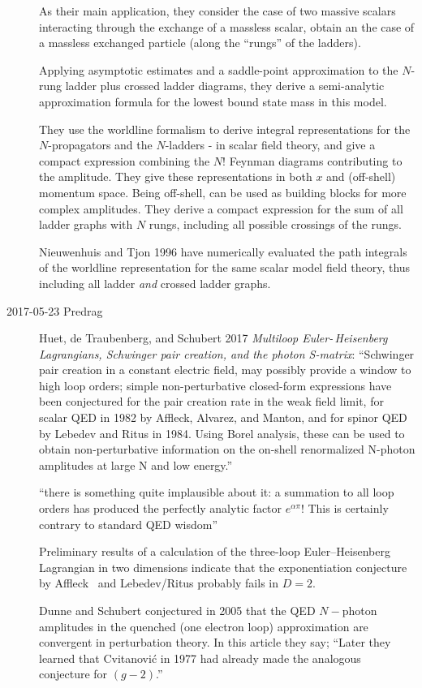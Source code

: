 \begin{description}
As their main application, they consider the case of two massive scalars
interacting through the exchange of a massless scalar, obtain an the case
of a massless exchanged particle (along the ``rungs'' of the ladders).

Applying
asymptotic estimates and a saddle-point approximation to the $N$-rung
ladder plus crossed ladder diagrams, they derive a semi-analytic
approximation formula for the lowest bound state mass in this model.

They use the worldline formalism to derive integral representations for
the $N$-propagators and the $N$-ladders - in scalar field theory,
and give a compact expression combining the $N!$ Feynman diagrams
contributing to the amplitude. They give these representations in both
$x$ and (off-shell) momentum space. Being off-shell, can be used
as building blocks for more complex amplitudes. They derive a
compact expression for the sum of all ladder graphs with $N$ rungs,
including all possible crossings of the rungs.

Nieuwenhuis and Tjon 1996 have numerically evaluated the path
integrals of the worldline representation for the same scalar model field
theory, thus including all ladder {\it and}
crossed ladder graphs.

\item[2017-05-23 Predrag]
Huet, de Traubenberg, and Schubert 2017
{\em Multiloop {Euler-\,Heisenberg Lagrangians, Schwinger} pair creation,
and the photon {S-matrix}}:
``Schwinger pair creation in a constant electric field, may possibly
provide a window to high loop orders; simple non-perturbative closed-form
expressions have been conjectured for the pair creation rate in the weak
field limit, for scalar QED in 1982 by Affleck, Alvarez, and
Manton, and for spinor QED by Lebedev and
Ritus in 1984. Using Borel analysis, these can be used to
obtain non-perturbative information on the on-shell renormalized N-photon
amplitudes at large N and low energy.''

``there is something quite implausible about it: a summation to all loop
orders has produced the perfectly analytic factor $e^{\alpha\pi}$! This is
certainly contrary to standard QED wisdom''

Preliminary results of a calculation of the three-loop Euler--Heisenberg
Lagrangian in two dimensions indicate that the exponentiation conjecture
by Affleck \etal\ and Lebedev/Ritus probably fails in $D = 2$.

Dunne and Schubert conjectured in 2005 that the QED $N-$photon amplitudes
in the quenched (one electron loop) approximation are convergent in
perturbation theory. In this article they say; ``Later they learned
that Cvitanovi\'c in 1977 had already made the analogous conjecture for
$(g-2)$.''


\end{description}
